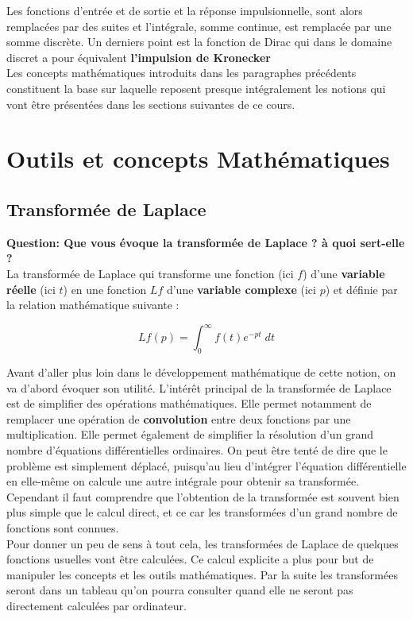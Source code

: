 \documentclass[11pt,a4paper]{article}
\begin{document}
Les fonctions d'entrée et de sortie et la réponse impulsionnelle, sont alors remplacées par des suites et l'intégrale, somme continue, est remplacée par une somme discrète. Un derniers point est la fonction de Dirac qui dans le domaine discret a pour équivalent \textbf{l'impulsion de Kronecker}\\ 

Les concepts mathématiques introduits dans les paragraphes précédents constituent la base sur laquelle reposent presque intégralement les notions qui vont être présentées dans les sections suivantes de ce cours.

\section{Outils et concepts Mathématiques}

\subsection{Transformée de Laplace} 

\textbf{Question: Que vous évoque la transformée de Laplace ? à quoi sert-elle ?}\\

La transformée de Laplace qui transforme une fonction (ici $f$) d'une \textbf{variable réelle} (ici $t$) en une fonction $L{f}$ d'une \textbf{variable complexe} (ici $p$) et définie par la relation mathématique suivante :

\[L{f}(p) = \int^{\infty}_{0} f(t) e^{-pt} \; dt\] 

Avant d'aller plus loin dans le développement mathématique de cette notion, on va d'abord évoquer son utilité. L'intérêt principal de la transformée de Laplace est de simplifier des opérations mathématiques. Elle permet notamment de remplacer une opération de \textbf{convolution} entre deux fonctions par une multiplication. Elle permet également de simplifier la résolution d'un grand nombre d'équations différentielles ordinaires. On peut être tenté de dire que le problème est simplement déplacé, puisqu'au lieu d'intégrer l'équation différentielle en elle-même on calcule une autre intégrale pour obtenir sa transformée. Cependant il faut comprendre que l'obtention de la transformée est souvent bien plus simple que le calcul direct, et ce car les transformées d'un grand nombre de fonctions sont connues.\\

Pour donner un peu de sens à tout cela, les transformées de Laplace de quelques fonctions usuelles vont être calculées. Ce calcul explicite a plus pour but de manipuler les concepts et les outils mathématiques. Par la suite les transformées seront dans un tableau qu'on pourra consulter quand elle ne seront pas directement calculées par  ordinateur.\\
\end{document}
